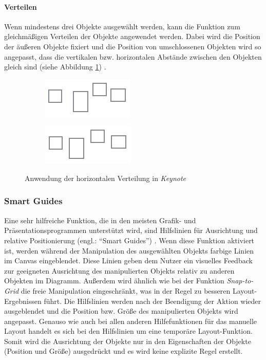 \paragraph{Verteilen}

Wenn mindestens drei Objekte ausgewählt werden, kann die Funktion zum gleichmäßigen Verteilen der Objekte angewendet werden. Dabei wird die Position der äußeren Objekte fixiert und die Position von umschlossenen Objekten wird so angepasst, dass die vertikalen bzw. horizontalen Abstände zwischen den Objekten gleich sind (siehe Abbildung \ref{fig:keynote-horizontal-distribution}) \cite{11Keynote}.

\begin{figure}[hbt]
    \newcommand{\subfigurewidth}{0.5\textwidth}
    \begin{subfigure}{\subfigurewidth}
        \centering
        \includegraphics{resources/keynote-horizontal-distribution-a}
        \caption{}
    \end{subfigure}
    \begin{subfigure}{\subfigurewidth}
        \centering
        \includegraphics{resources/keynote-horizontal-distribution-b}
        \caption{}
    \end{subfigure}
    \caption{Anwendung der horizontalen Verteilung in \textit{Keynote}}
    \label{fig:keynote-horizontal-distribution}
\end{figure}

\subsubsection{Smart Guides}
\label{subsubsec:smart-guides}

Eine sehr hilfreiche Funktion, die in den meisten Grafik- und Präsentationsprogrammen unterstützt wird, sind Hilfslinien für Ausrichtung und relative Positionierung (engl.: \enquote{Smart Guides}) \cite{11Keynote}. Wenn diese Funktion aktiviert ist, werden während der Manipulation des ausgewählten Objekts farbige Linien im Canvas eingeblendet. Diese Linien geben dem Nutzer ein visuelles Feedback zur geeigneten Ausrichtung des manipulierten Objekts relativ zu anderen Objekten im Diagramm. Außerdem wird ähnlich wie bei der Funktion \textit{Snap-to-Grid} die freie Manipulation eingeschränkt, was in der Regel zu besseren Layout-Ergebnissen führt. Die Hilfslinien werden nach der Beendigung der Aktion wieder ausgeblendet und die Position bzw. Größe des manipulierten Objekts wird angepasst. Genauso wie auch bei allen anderen Hilfefunktionen für das manuelle Layout handelt es sich bei den Hilfslinien um eine temporäre Layout-Funktion. Somit wird die Ausrichtung der Objekte nur in den Eigenschaften der Objekte (Position und Größe) ausgedrückt und es wird keine explizite Regel erstellt.

